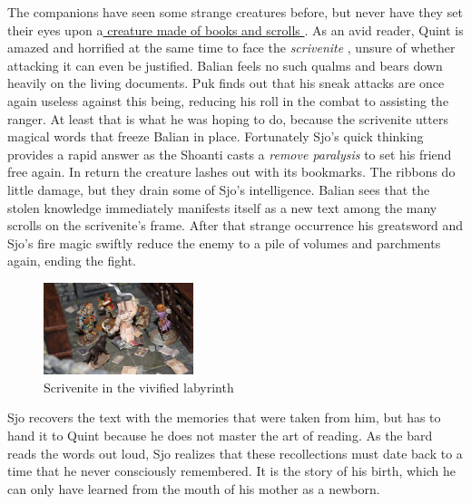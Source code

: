 The companions have seen some strange creatures before, but never have they set their eyes upon a\hyperref[fig:Scrivenite-in-the-vivified-labyrinth-563932189]{ creature made of books and scrolls } . As an avid reader, Quint is amazed and horrified at the same time to face the  {\itshape scrivenite} , unsure of whether attacking it can even be justified. Balian feels no such qualms and bears down heavily on the living documents. Puk finds out that his sneak attacks are once again useless against this being, reducing his roll in the combat to assisting the ranger. At least that is what he was hoping to do, because the scrivenite utters magical words that freeze Balian in place. Fortunately Sjo's quick thinking provides a rapid answer as the Shoanti casts a  {\itshape remove paralysis} to set his friend free again. In return the creature lashes out with its bookmarks. The ribbons do little damage, but they drain some of Sjo's intelligence. Balian sees that the stolen knowledge immediately manifests itself as a new text among the many scrolls on the scrivenite's frame. After that strange occurrence his greatsword and Sjo's fire magic swiftly reduce the enemy to a pile of volumes and parchments again, ending the fight. \\

\begin{figure}[h]
	\centering
	\includegraphics[width=0.39\textwidth]{images/Scrivenite-in-the-vivified-labyrinth-563932189.jpg}
	\caption{Scrivenite in the vivified labyrinth}
	\label{fig:Scrivenite-in-the-vivified-labyrinth-563932189}
\end{figure}

Sjo recovers the text with the memories that were taken from him, but has to hand it to Quint because he does not master the art of reading. As the bard reads the words out loud, Sjo realizes that these recollections must date back to a time that he never consciously remembered. It is the story of his birth, which he can only have learned from the mouth of his mother as a newborn.\\

